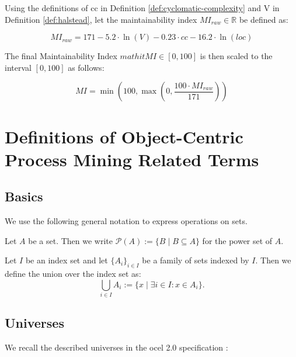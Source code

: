 \begin{definition}\label{def:maintainability-index}
Using the definitions of \ac{cc} in Definition \autoref{def:cyclomatic-complexity} and V in Definition \autoref{def:halstead}, let the maintainability index $\mathit{MI}_{raw} \in \mathbb{R}$ be defined as:

\[
\mathit{MI}_{raw} = 171 - 5.2 \cdot \ln(\mathit{V}) - 0.23 \cdot \mathit{cc} - 16.2 \cdot \ln(\mathit{loc})
\]

The final Maintainability Index $mathit{MI} \in [0, 100]$ is then scaled to the interval $[0, 100]$ as follows:

\[
\mathit{MI} = \min\left(100, \max\left(0, \frac{100 \cdot \mathit{MI}_{raw}}{171}\right)\right)
\]	
\end{definition}

\section{Definitions of Object-Centric Process Mining Related Terms}\label{sec:ocpm-related-terms}
\subsection{Basics}\label{ssec:basics}
We use the following general notation to express operations on sets.

\begin{definition}\label{def:power-set}
Let $A$ be a set. Then we write $\mathcal{P}(A) := \{ B \mid B \subseteq A \}$ for the power set of $A$.
\end{definition}

\begin{definition}\label{def:indexed-union}
Let $I$ be an index set and let $\{ A_i \}_{i \in I}$ be a family of sets indexed by $I$. Then we define the union over the index set as:
\[
\bigcup_{i \in I} A_i := \{ x \mid \exists i \in I: x \in A_i \}.
\]
\end{definition}

\subsection{Universes}\label{ssec:universes}

We recall the described universes in the \ac{ocel} 2.0 specification \autocite{DBLP:journals/corr/abs-2403-01975}:

